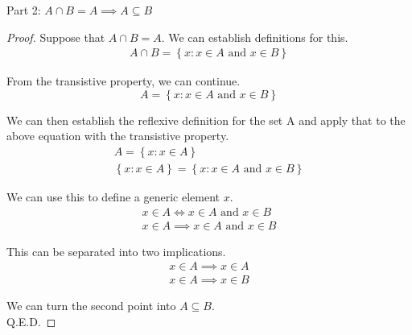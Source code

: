 \documentclass[12pt]{report}
\begin{document}
\newcommand{\andtxt}{\text{ and }}
Part 2: $A \cap B = A \implies A \subseteq B$
\begin{proof}
    Suppose that $A \cap B = A$.
    We can establish definitions for this.
    \begin{gather}
        A \cap B = \left\{x: x \in A \andtxt x \in B\right\}
    \end{gather}

    From the transistive property, we can continue.
    \begin{equation}
        A = \left\{x: x \in A \andtxt x \in B\right\}
    \end{equation}

    We can then establish the reflexive definition for the set A and apply that to the above equation with the transistive property.
    \begin{gather}
        A = \left\{ x: x \in A \right\}\\
        \left\{ x: x \in A \right\} = \left\{x: x \in A \andtxt x \in B\right\}
    \end{gather}

    We can use this to define a generic element $x$.
    \begin{gather}
        x \in A \Leftrightarrow x \in A \andtxt x \in B\\
        x \in A \implies x \in A \andtxt x \in B
    \end{gather}

    This can be separated into two implications.
    \begin{gather}
        x \in A \implies x \in A\\
        x \in A \implies x \in B
    \end{gather}

    We can turn the second point into $A \subseteq B$.\\
    Q.E.D.
\end{proof}
\end{document}
